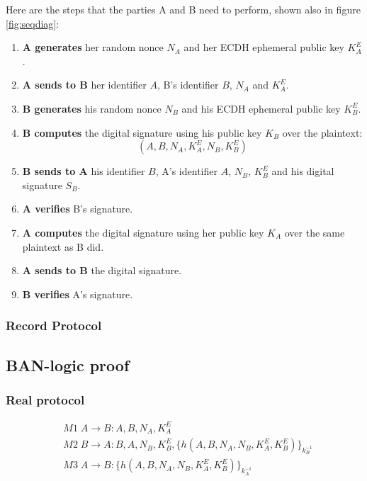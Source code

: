 Here are the steps that the parties A and B need to perform, shown also in figure
\ref{fig:seqdiag}:
\begin{enumerate}
    \item \textbf{A generates} her random nonce $N_A$ and her ECDH ephemeral public key $K^E_A$.
    \item \textbf{A sends to B} her identifier $A$, B's identifier $B$, $N_A$ and $K^E_A$.
    \item \textbf{B generates} his random nonce $N_B$ and his ECDH ephemeral public key $K^E_B$.
    \item \textbf{B computes} the digital signature using his public key $K_B$ over the plaintext:
    \begin{equation*}
            (A,B,N_A,K^E_A,N_B,K^E_B)
    \end{equation*}
    \item \textbf{B sends to A} his identifier $B$, A's identifier $A$, $N_B$, $K^E_B$ and his digital signature $S_B$.
    \item \textbf{A verifies} B's signature.
    \item \textbf{A computes} the digital signature using her public key $K_A$ over the same plaintext as B did.
    \item \textbf{A sends to B} the digital signature.
    \item \textbf{B verifies} A's signature.
\end{enumerate}



\subsubsection{Record Protocol}

\subsection{BAN-logic proof}
\subsubsection{Real protocol}
\begin{align*}
    &M1 \; A \rightarrow B : A, B, N_A, K_A^E \\
    &M2 \; B \rightarrow A : B, A, N_B, K_B^E, \{h(A,B,N_A,N_B,K_A^E,K_B^E)\}_{k_B^{-1}} \\
    &M3 \; A \rightarrow B : \{h(A,B,N_A,N_B,K_A^E,K_B^E)\}_{k_A^{-1}}
\end{align*}

